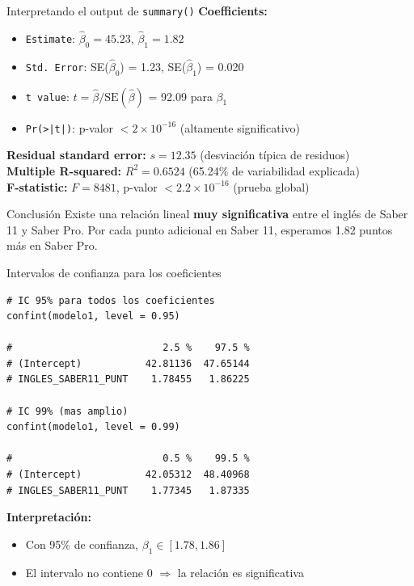 \documentclass[aspectratio=169, 11pt]{beamer}
\begin{document}
\begin{frame}{Interpretando el output de \texttt{summary()}}
\textbf{Coefficients:}
\begin{itemize}
  \item \texttt{Estimate}: $\hat{\beta}_0 = 45.23$, $\hat{\beta}_1 = 1.82$
  \item \texttt{Std. Error}: SE($\hat{\beta}_0$) = 1.23, SE($\hat{\beta}_1$) = 0.020
  \item \texttt{t value}: $t = \hat{\beta}/\text{SE}(\hat{\beta})$ = 92.09 para $\beta_1$
  \item \texttt{Pr(>|t|)}: p-valor $< 2 \times 10^{-16}$ (altamente significativo)
\end{itemize}

\vspace{0.1cm}
{\small
\textbf{Residual standard error:} $s = 12.35$ (desviaci\'on t\'ipica de residuos)\\
\textbf{Multiple R-squared:} $R^2 = 0.6524$ (65.24\% de variabilidad explicada)\\
\textbf{F-statistic:} $F = 8481$, p-valor $< 2.2 \times 10^{-16}$ (prueba global)
}

\vspace{0.1cm}
\begin{alertblock}{Conclusi\'on}
\small Existe una relaci\'on lineal \textbf{muy significativa} entre el ingl\'es de Saber 11 y Saber Pro. Por cada punto adicional en Saber 11, esperamos 1.82 puntos m\'as en Saber Pro.
\end{alertblock}
\end{frame}

\begin{frame}[fragile]{Intervalos de confianza para los coeficientes}
\begin{lstlisting}
# IC 95% para todos los coeficientes
confint(modelo1, level = 0.95)

#                          2.5 %    97.5 %
# (Intercept)           42.81136  47.65144
# INGLES_SABER11_PUNT    1.78455   1.86225

# IC 99% (mas amplio)
confint(modelo1, level = 0.99)

#                          0.5 %    99.5 %
# (Intercept)           42.05312  48.40968
# INGLES_SABER11_PUNT    1.77345   1.87335
\end{lstlisting}

\vspace{0.2cm}
\textbf{Interpretación:}
\begin{itemize}
  \item Con 95\% de confianza, $\beta_1 \in [1.78, 1.86]$
  \item El intervalo no contiene 0 $\Rightarrow$ la relación es significativa
\end{itemize}
\end{frame}
\end{document}
